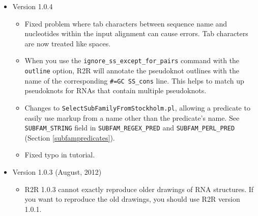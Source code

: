 \documentclass[letterpaper,12pt]{report}
\begin{document}
\begin{itemize}
\begin{itemize}
    \end{itemize}
\item Version 1.0.4
	\begin{itemize}
          \item Fixed problem where tab characters between sequence name and nucleotides within the input alignment can cause errors.  Tab characters are now treated like spaces.
          \item When you use the {\tt ignore\_ss\_except\_for\_pairs} command with the {\tt outline} option, R2R will annotate the pseudoknot outlines with the name of the corresponding {\tt \#=GC SS\_cons} line.  This helps to match up pseudoknots for RNAs that contain multiple pseudoknots.
            \item Changes to {\tt SelectSubFamilyFromStockholm.pl}, allowing a predicate to easily use markup from a name other than the predicate's name.  See {\tt SUBFAM\_STRING} field in {\tt SUBFAM\_REGEX\_PRED} and {\tt SUBFAM\_PERL\_PRED} (Section \ref{subfampredicates}).
          \item Fixed typo in tutorial.
	\end{itemize}
\item Version 1.0.3 (August, 2012)
        \begin{itemize}
	\item R2R 1.0.3 cannot exactly reproduce older drawings of RNA structures.  If you want to reproduce the old drawings, you should use R2R version 1.0.1.


\end{itemize}
\end{itemize}
\end{document}
